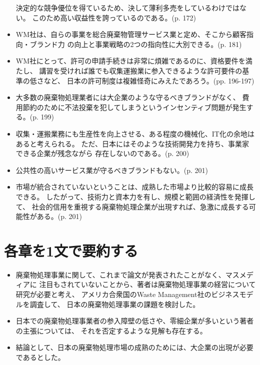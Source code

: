 \documentclass[a4j]{jsarticle}
\begin{document}
\begin{itemize}
  決定的な競争優位を得ているため、決して薄利多売をしているわけではない。
  このため高い収益性を誇っているのである。(p. 172)
\item
  WM社は、自らの事業を総合廃棄物管理サービス業と定め、そこから顧客指向・ブランド力
  の向上と事業戦略の2つの指向性に大別できる。(p. 181)
\item
  WM社にとって、許可の申請手続きは非常に煩雑であるのに、資格要件を満たし、
  講習を受ければ誰でも収集運搬業に参入できるような許可要件の基準の低さなど、
  日本の許可制度は複雑怪奇にみえたであろう。(pp. 196-197)
\item
  大多数の廃棄物処理業者には大企業のような守るべきブランドがなく、
  費用節約のために不法投棄を犯してしまうというインセンティブ問題が発生する。(p. 199)
\item
  収集・運搬業務にも生産性を向上させる、ある程度の機械化、IT化の余地はあると考えられる。
  ただ、日本にはそのような技術開発力を持ち、事業家できる企業が残念ながら
  存在しないのである。(p. 200)
\item
  公共性の高いサービス業が守るべきブランドもない。(p. 201)
\item
  市場が統合されていないということは、成熟した市場より比較的容易に成長できる。
  したがって、技術力と資本力を有し、規模と範囲の経済性を発揮して、
  社会的信用を重視する廃棄物処理企業が出現すれば、急激に成長する可能性がある。(p. 201)
\end{itemize}


\section{各章を1文で要約する}
\begin{itemize}
\item
  廃棄物処理事業に関して、これまで論文が発表されたことがなく、マスメディアに
  注目もされていないことから、著者は廃棄物処理事業の経営について研究が必要と考え、
  アメリカ合衆国のWaste Management社のビジネスモデルを調査して、
  日本の廃棄物処理事業の課題を検討した。
\item
  日本での廃棄物処理事業者の参入障壁の低さや、零細企業が多いという著者の主張については、
  それを否定するような見解も存在する。
  ~\cite{sangyo-haikibutsu-shorigyo-no-keiei-jitsumu-daiichihoki}
\item
  結論として、日本の廃棄物処理市場の成熟のためには、大企業の出現が必要であるとした。
\end{itemize}



\end{document}
